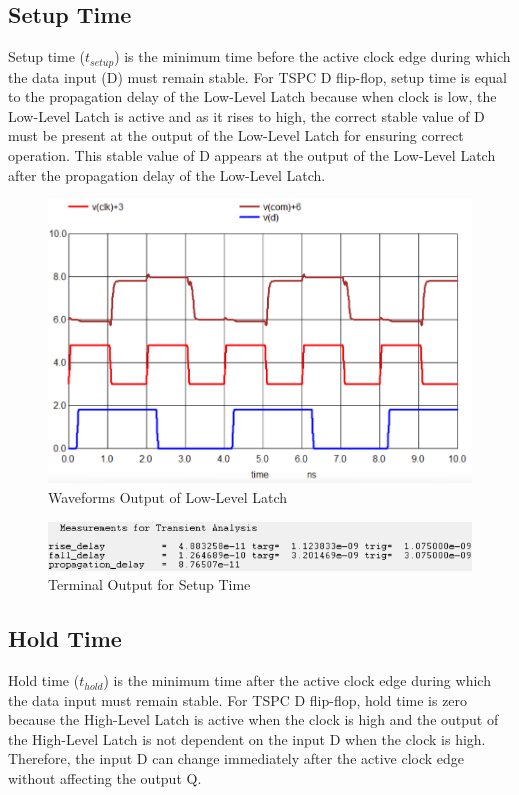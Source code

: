 \documentclass[conference]{IEEEtran}
\begin{document}
\subsection{Setup Time}
Setup time ($t_{setup}$) is the minimum time before the active clock edge during which the data input (D) must remain stable. For TSPC D flip-flop, setup time is equal to the propagation delay of the Low-Level Latch because when clock is low, the Low-Level Latch is active and as it rises to high, the correct stable value of D must be present at the output of the Low-Level Latch for ensuring correct operation. This stable value of D appears at the output of the Low-Level Latch after the propagation delay of the Low-Level Latch.

\begin{figure}[H]
    \centering
    \includegraphics[width=1\linewidth]{dflipsetupsimres.png}
    \caption{Waveforms Output of Low-Level Latch}
    \label{fig:dff_setup}
\end{figure}

\begin{figure}[H]
    \centering
    \includegraphics[width=1\linewidth]{dflipsetupterm.png}
    \caption{Terminal Output for Setup Time}
    \label{fig:dff_setup_term}
\end{figure}

\subsection{Hold Time}
Hold time ($t_{hold}$) is the minimum time after the active clock edge during which the data input must remain stable. For TSPC D flip-flop, hold time is zero because the High-Level Latch is active when the clock is high and the output of the High-Level Latch is not dependent on the input D when the clock is high. Therefore, the input D can change immediately after the active clock edge without affecting the output Q.
\end{document}
